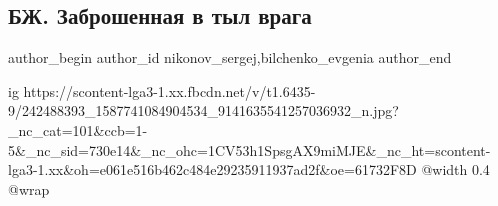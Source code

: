  
 
 
 
 
 
\subsection{БЖ. Заброшенная в тыл врага}
\label{sec:23_09_2021.fb.nikonov_sergej.2.tyl_vraga}
 
\ifcmt
 author_begin
   author_id nikonov_sergej,bilchenko_evgenia
 author_end
\fi


\ifcmt
  ig https://scontent-lga3-1.xx.fbcdn.net/v/t1.6435-9/242488393_1587741084904534_9141635541257036932_n.jpg?_nc_cat=101&ccb=1-5&_nc_sid=730e14&_nc_ohc=1CV53h1SpsgAX9miMJE&_nc_ht=scontent-lga3-1.xx&oh=e061e516b462c484e29235911937ad2f&oe=61732F8D
  @width 0.4
  @wrap 
\fi

